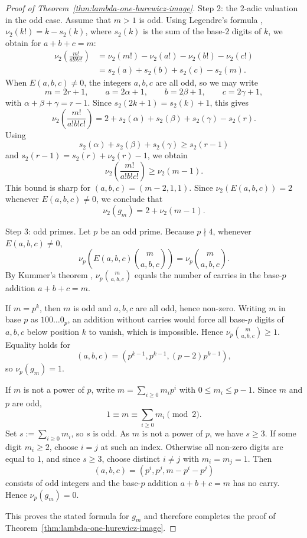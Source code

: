 \documentclass[a4paper]{amsart}
\theoremstyle{plain}
\theoremstyle{definition}
\renewcommand{\le}{\leqslant}
\renewcommand{\ge}{\geqslant}
\begin{document}
\begin{proof}[Proof of Theorem~\ref{thm:lambda-one-hurewicz-image}]
	Step 2: the $2$-adic valuation in the odd case. Assume that $m>1$ is odd. Using Legendre's formula \cite[p.10]{legendre1830theorie}, $\nu_2(k!) = k-s_2(k)$, where $s_2(k)$ is the sum of the base-$2$ digits of $k$, we obtain for $a+b+c=m$:
	\[
		\begin{aligned}
			\nu_2 \left(\frac{m!}{a!b!c!}\right) & = \nu_2(m!) - \nu_2(a!) - \nu_2(b!) - \nu_2(c!) \\
			                                     & = s_2(a) + s_2(b) + s_2(c) - s_2(m).
		\end{aligned}
	\]
	When $E(a,b,c)\neq 0$, the integers $a,b,c$ are all odd, so we may write
	\[
		m = 2r+1,\qquad a = 2 \alpha +1,\qquad b = 2\beta +1,\qquad c = 2\gamma +1,
	\]
	with $\alpha + \beta + \gamma = r-1$. Since $s_2(2k+1) = s_2(k) + 1$, this gives
	\[
		\nu_2 \left(\frac{m!}{a!b!c!}\right) = 2 + s_2(\alpha) + s_2(\beta) + s_2(\gamma) - s_2(r).
	\]
	Using
	\[
		s_2(\alpha) + s_2(\beta) + s_2(\gamma) \ge s_2(r-1)
	\]
	and $s_2(r-1) = s_2(r) + \nu_2(r) - 1$, we obtain
	\[
		\nu_2 \left(\frac{m!}{a!b!c!}\right) \ge \nu_2(m-1).
	\]
	This bound is sharp for $(a,b,c)=(m-2,1,1)$. Since $\nu_2(E(a,b,c))=2$ whenever $E(a,b,c)\neq 0$, we conclude that
	\[
		\nu_2(g_m)=2+\nu_2(m-1).
	\]

	Step 3: odd primes. Let $p$ be an odd prime. Because $p\nmid 4$, whenever $E(a,b,c)\neq 0$,
	\[
		\nu_p\left(E(a,b,c)\binom{m}{a,b,c}\right)=\nu_p\binom{m}{a,b,c}.
	\]
	By Kummer's theorem \cite{kummer1852uber}, $\nu_p\binom{m}{a,b,c}$ equals the number of carries in the base-$p$ addition $a+b+c=m$.

	If $m=p^k$, then $m$ is odd and $a,b,c$ are all odd, hence non-zero. Writing $m$ in base $p$ as $100\ldots0_p$, an addition without carries would force all base-$p$ digits of $a,b,c$ below position $k$ to vanish, which is impossible. Hence $\nu_p\binom{m}{a,b,c}\ge 1$. Equality holds for
	\[
		(a,b,c) = (p^{k-1},p^{k-1}, (p-2)p^{k-1}),
	\]
	so $\nu_p(g_m)=1$.

	If $m$ is not a power of $p$, write $m = \sum_{i\ge 0} m_i p^{i}$ with $0\le m_i \le p-1$. Since $m$ and $p$ are odd,
	\[
		1 \equiv m \equiv \sum_{i\ge 0} m_i \pmod 2.
	\]
	Set $s:= \sum_{i\ge 0} m_i$, so $s$ is odd. As $m$ is not a power of $p$, we have $s\ge 3$. If some digit $m_i\ge 2$, choose $i=j$ at such an index. Otherwise all non-zero digits are equal to $1$, and since $s\ge 3$, choose distinct $i\neq j$ with $m_i=m_j=1$. Then
	\[
		(a,b,c)=(p^i,p^j,m-p^i-p^j)
	\]
	consists of odd integers and the base-$p$ addition $a+b+c=m$ has no carry. Hence $\nu_p(g_m)=0$.

	This proves the stated formula for $g_m$ and therefore completes the proof of Theorem~\ref{thm:lambda-one-hurewicz-image}.
\end{proof}
\end{document}
